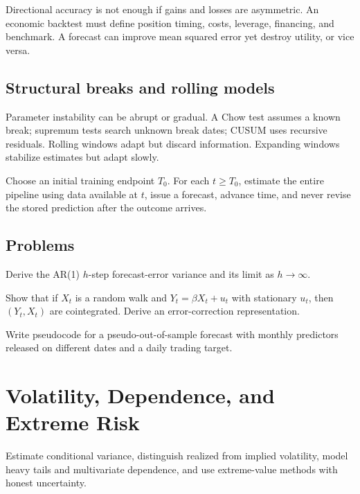 Directional accuracy is not enough if gains and losses are asymmetric. An economic
backtest must define position timing, costs, leverage, financing, and benchmark. A
forecast can improve mean squared error yet destroy utility, or vice versa.

\section{Structural breaks and rolling models}

Parameter instability can be abrupt or gradual. A Chow test assumes a known break;
supremum tests search unknown break dates; CUSUM uses recursive residuals. Rolling
windows adapt but discard information. Expanding windows stabilize estimates but
adapt slowly.

\begin{definition}
Choose an initial training endpoint $T_0$. For each $t\geq T_0$, estimate the entire
pipeline using data available at $t$, issue a forecast, advance time, and never
revise the stored prediction after the outcome arrives.
\end{definition}

\section{Problems}

\begin{exercise}
Derive the AR(1) $h$-step forecast-error variance and its limit as $h\to\infty$.
\end{exercise}
\begin{exercise}
Show that if $X_t$ is a random walk and $Y_t=\beta X_t+u_t$ with stationary $u_t$,
then $(Y_t,X_t)$ are cointegrated. Derive an error-correction representation.
\end{exercise}
\begin{exercise}
Write pseudocode for a pseudo-out-of-sample forecast with monthly predictors released
on different dates and a daily trading target.
\end{exercise}


\chapter{Volatility, Dependence, and Extreme Risk}

\begin{objectives}
Estimate conditional variance, distinguish realized from implied volatility, model
heavy tails and multivariate dependence, and use extreme-value methods with honest
uncertainty.
\end{objectives}

